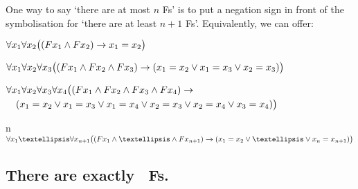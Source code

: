 One way to say `there are at most $n$ Fs' is to put a negation sign in front of the symbolisation for `there are at least $n+1$ Fs'. Equivalently, we can offer:
\begin{ekey}
\item[\text{one}] $\forall x_1\forall x_2\bigl( (Fx_1 \wedge Fx_2) \rightarrow x_1=x_2\bigr)$
\item[\text{two}] $\forall x_1\forall x_2\forall x_3\bigl( (Fx_1 \wedge Fx_2 \wedge Fx_3) \rightarrow (x_1=x_2 \vee x_1=x_3 \vee x_2=x_3) \bigr)$
\item[\text{three}] $\begin{multlined}[t]
	\forall x_1\forall x_2\forall x_3\forall x_4\bigl( (Fx_1 \eand Fx_2 \eand Fx_3 \eand Fx_4) \eif \\
(x_1=x_2 \eor x_1=x_3 \eor x_1=x_4 \eor x_2=x_3 \eor x_2=x_4 \eor x_3=x_4) \bigr)
\end{multlined}$
\item[n]$\forall x_1…\forall x_{n+1}
\bigl( (Fx_1\eand … \eand Fx_{n+1}) \eif (x_1=x_2 \eor … \eor x_n=x_{n+1}) \bigr)$ 
\end{ekey}
\subsection*{There are exactly \blank\ Fs.}
\label{summary.exactly}


